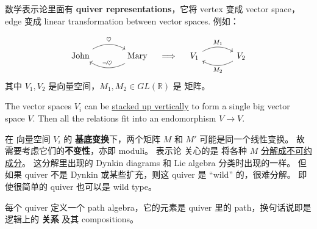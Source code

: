 \documentclass[12pt, orivec]{article}
\newcommand{\cc}[2]{#1}
\newcommand{\cc}[2]{#2}
\begin{document}
\begin{tcolorbox}[breakable, parbox=false, fonttitle=\bfseries, title=Quiver representations]
\cc{数学表示论里面有 \textbf{quiver representations}，它将 vertex 变成 vector space，edge 变成 linear transformation between vector spaces. 例如：
}{
In representation theory one studies \textbf{quiver representations}, which turns \textbf{vertices} into vector spaces and \textbf{edges} into linear transformations between vector spaces.  For example:}
\begin{equation}
\begin{tikzcd}[column sep = large]
\mbox{John} \arrow[r, bend left, "\heartsuit"] & \arrow[l, bend left, swap, "\neg \heartsuit"] \mbox{Mary}
\end{tikzcd}
\quad \Longrightarrow \quad
\begin{tikzcd}[column sep = large]
V_1 \arrow[r, bend left, "M_1"] & \arrow[l, bend left, "M_2"] V_2
\end{tikzcd}
\end{equation}
\cc{其中 $V_1, V_2$ 是向量空间，$M_1, M_2 \in GL(\mathbb{R})$ 是 矩阵。
}{
where $V_1, V_2$ are vector spaces, $M_1, M_2 \in GL(\mathbb{R})$ are matrices.}

The vector spaces $V_i$ can be \uline{stacked up vertically} to form a single big vector space $V$.  Then all the relations fit into an endomorphism $V \rightarrow V$.

\cc{在 向量空间 $V_i$ 的 \textbf{基底变换}下，两个矩阵 $M$ 和 $M'$ 可能是同一个线性变换。  故需要考虑它们的\textbf{不变性}，亦即 moduli。 表示论 关心的是 将各种 $M$ \uline{分解成不可约成分}。 这分解里出现的 Dynkin diagrams 和 Lie algebra 分类时出现的一样。  但如果 quiver 不是 Dynkin 或某些扩充，则这 quiver 是 ``wild'' 的，很难分解。 即使很简单的 quiver 也可以是 wild type。
}{
Under \textbf{change of basis} of the vector spaces $V_i$, two matrices $M$ and $M'$ may turn out to be the same linear transformation. Therefore, we need to consider their \textbf {invariant form} or \textbf{moduli}. Representation theory is concerned with the decomposition of $M$ \uline{into irreducible components}. The \textbf{Dynkin diagrams} that arise in this decomposition are the same as those found in Lie algebra classification.  If the quiver is not a Dynkin diagram then the quiver is ``wild'' and is generally difficult to study.  Even a simple quiver can be of wild type.}

\cc{每个 quiver 定义一个 path algebra，它的元素是 quiver 里的 path，换句话说即是逻辑上的 \textbf{关系} 及其 compositions。
}{
Each quiver defines a \textbf{path algebra} whose elements are the paths in the quiver.  In logic these paths correspond to logical \textbf{relations} and their composition.}
\end{tcolorbox}
\end{document}
